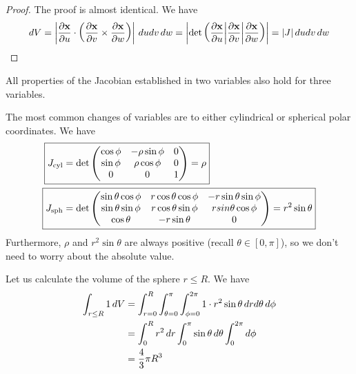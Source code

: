 \documentclass{../../template/note}
\begin{document}
    \begin{proof}
        The proof is almost identical. We have
        \begin{align*}
            dV = \left|\pd{\V x}u \cdot \left(\pd{\V x}v \times \pd{\V x}w\right)\right|\D u dv \, dw = \left|\det\left(\pd{\V x}u \middle| \pd{\V x}v \middle| \pd{\V x}w\right)\right| = |J| \D u dv \, dw
        \end{align*}
    \end{proof}

    
    All properties of the Jacobian established in two variables also hold for three variables.

    The most common changes of variables are to either cylindrical or spherical polar coordinates. We have
    \begin{align*}
        \Aboxed{J_\text{cyl} &= \det {\begin{pmatrix}
         \cos \phi & -\rho \sin \phi & 0 \\
         \sin \phi & \rho \cos \phi & 0 \\
         0 & 0 & 1 \\
        \end{pmatrix}} = \rho} \\
        \Aboxed{J_\text{sph} &= \det {\begin{pmatrix}
         \sin \theta \cos \phi & r \cos \theta \cos \phi & -r \sin \theta \sin \phi \\
         \sin \theta \sin \phi & r \cos \theta \sin \phi & r sin \theta \cos \phi \\
         \cos \theta & -r \sin \theta & 0 \\
        \end{pmatrix}} = r^2 \sin \theta}
    \end{align*}
    Furthermore, \(\rho\) and \(r^2 \sin \theta\) are always positive (recall \(\theta \in [0, \pi]\)), so we don't need to worry about the absolute value.

    \begin{example*}
        Let us calculate the volume of the sphere \(r \leq R\). We have
        \begin{align*}
            \int_{r \leq R} 1 \,d{V} &= \int_{r=0}^R \int_{\theta=0}^\pi \int_{\phi=0}^{2\pi} 1 \cdot r^2 \sin \theta \,d{r} d\theta \, d\phi \\
            &= \int_0^R r^2 \,d{r} \int_0^\pi \sin \theta \,d{\theta} \int_0^{2\pi} d\phi \\
            &= \frac 4 3 \pi R^3
        \end{align*}
    \end{example*}
    
\end{document}
